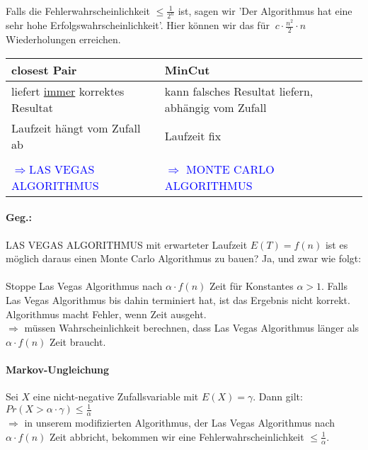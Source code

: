 \paragraph*{} Falls die Fehlerwahrscheinlichkeit $\leq \frac{1}{2^n}$ ist, sagen wir 'Der Algorithmus hat eine sehr hohe Erfolgswahrscheinlichkeit'. Hier können wir das für $~ c \cdot \frac{n^2}{2} \cdot n$ Wiederholungen erreichen.

\begin{table}
\centering
\begin{tabular}{l|l}
closest Pair & MinCut \\
\hline
\hline
liefert \underline{immer} korrektes Resultat & kann falsches Resultat liefern, abhängig vom Zufall \\
\hline
Laufzeit hängt vom Zufall ab & Laufzeit fix \\
& \\
\textcolor{blue}{$\Rightarrow$LAS VEGAS ALGORITHMUS} & \textcolor{blue}{$\Rightarrow$ MONTE CARLO ALGORITHMUS} \\
\end{tabular}
\end{table}

\paragraph*{Geg.:} LAS VEGAS ALGORITHMUS mit erwarteter Laufzeit $E(T) = f(n)$ ist es möglich daraus einen Monte Carlo Algorithmus zu bauen? Ja, und zwar wie folgt:
\paragraph*{} Stoppe Las Vegas Algorithmus nach $\alpha \cdot f(n)$ Zeit für Konstantes $\alpha > 1$. Falls Las Vegas Algorithmus bis dahin terminiert hat, ist das Ergebnis nicht korrekt. Algorithmus macht Fehler, wenn Zeit ausgeht. \\
$\Rightarrow$ müssen Wahrscheinlichkeit berechnen, dass Las Vegas Algorithmus länger als $\alpha \cdot f(n)$ Zeit braucht.

\paragraph*{Markov-Ungleichung} Sei $X$ eine nicht-negative Zufallsvariable mit $E(X) = \gamma$. %
Dann gilt: $Pr(X > \alpha \cdot \gamma) \leq \frac{1}{\alpha}$ \\
$\Rightarrow$ in unserem modifizierten Algorithmus, der Las Vegas Algorithmus nach $\alpha \cdot f(n)$ Zeit abbricht, bekommen wir eine Fehlerwahrscheinlichkeit $\leq \frac{1}{\alpha}$.


